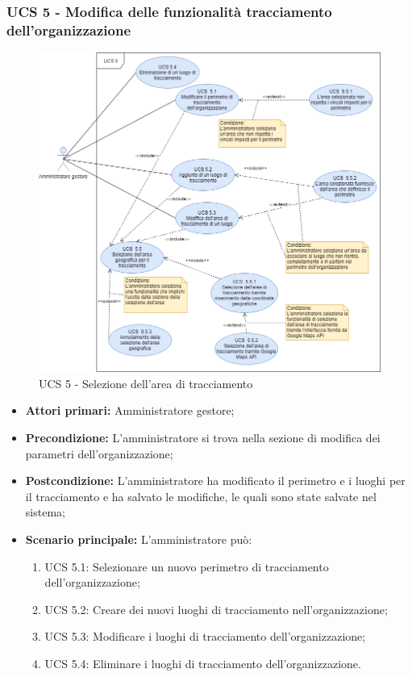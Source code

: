 \subsubsection{UCS 5 - Modifica delle funzionalità tracciamento dell'organizzazione}%
\begin{figure}[h]
	\centering
    \includegraphics[scale=0.53]{sezioni/UseCase/Immagini/UCS5.png}
    \caption{UCS 5 - Selezione dell'area di tracciamento}
\end{figure}
\begin{itemize}
    \item \textbf{Attori primari:} Amministratore gestore;
    \item \textbf{Precondizione:} L'amministratore si trova nella sezione di modifica dei parametri dell'organizzazione;
    \item \textbf{Postcondizione:} L'amministratore ha modificato il perimetro e i luoghi per il tracciamento e ha salvato le modifiche, le quali sono state salvate nel sistema;
    \item \textbf{Scenario principale:} L'amministratore può:
    \begin{enumerate}
        \item UCS 5.1: Selezionare un nuovo perimetro di tracciamento dell'organizzazione;
        \item UCS 5.2: Creare dei nuovi luoghi di tracciamento nell'organizzazione;
        \item UCS 5.3: Modificare i luoghi di tracciamento dell'organizzazione;
        \item UCS 5.4: Eliminare i luoghi di tracciamento dell'organizzazione.
    \end{enumerate}
\end{itemize}

